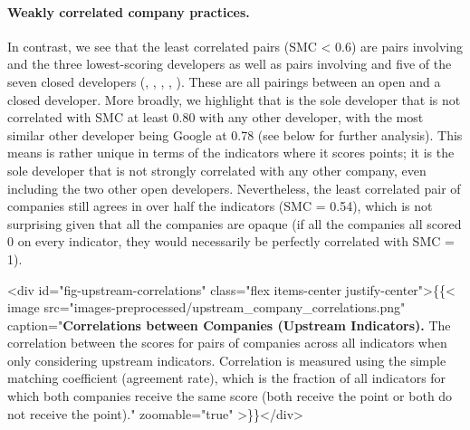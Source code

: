 \documentclass[screen, authorversion, acmsmall]{acmart}
\begin{document}
\paragraph{Weakly correlated company practices.}
In contrast, we see that the least correlated pairs (SMC < 0.6) are pairs involving \meta and the three lowest-scoring developers as well as pairs involving \huggingface and five of the seven closed developers (\openai, \cohere, \aitwentyone, \inflection, \amazon).
These are all pairings between an open and a closed developer.
More broadly, we highlight that \meta is the sole developer that is not correlated with SMC at least 0.80 with any other developer, with the most similar other developer being Google at 0.78 (see below for further analysis). 
This means \meta is rather unique in terms of the indicators where it scores points; it is the sole developer that is not strongly correlated with any other company, even including the two other open developers.
Nevertheless, the least correlated pair of companies still agrees in over half the indicators (SMC = 0.54), which is not surprising given that all the companies are opaque (\eg if all the companies all scored 0 on every indicator, they would necessarily be perfectly correlated with SMC = 1).

<div id="fig-upstream-correlations" class="flex items-center justify-center">\{\{< image src="images-preprocessed/upstream_company_correlations.png" caption="\textbf{Correlations between Companies (Upstream Indicators).} The correlation between the scores for pairs of companies across all indicators when only considering upstream indicators. Correlation is measured using the simple matching coefficient (\ie agreement rate), which is the fraction of all indicators for which both companies receive the same score (\ie both receive the point or both do not receive the point)." zoomable="true" >\}\}</div>
\end{document}
